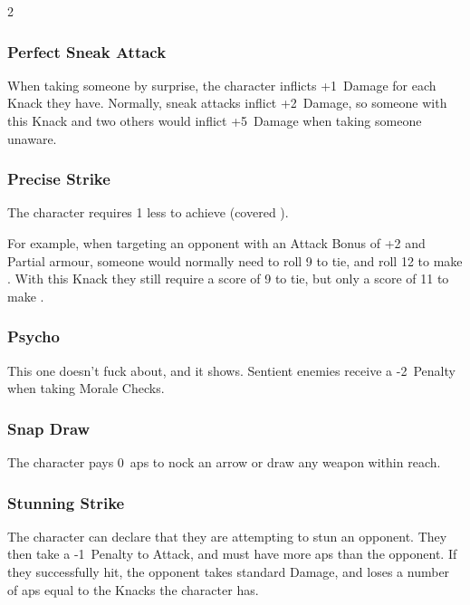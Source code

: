 \begin{multicols}{2}
\subsubsection{Perfect Sneak Attack}

When taking someone by surprise, the character inflicts +1~Damage for each Knack they have.
Normally, sneak attacks inflict +2~Damage, so someone with this Knack and two others would inflict +5~Damage when taking someone unaware.

\subsubsection{Precise Strike}\label{precisestrike}

The character requires 1 less to achieve  (covered ).

\begin{exampletext}
  \noindent%
  For example, when targeting an opponent with an Attack Bonus of +2 and Partial armour, someone would normally need to roll 9 to tie, and roll 12 to make .
  With this Knack they still require a score of 9 to tie, but only a score of 11 to make .
\end{exampletext}

\subsubsection{Psycho}

This one doesn't fuck about, and it shows.
Sentient enemies receive a -2~Penalty when taking Morale Checks.%

\subsubsection{Snap Draw}
\label{snapDraw}

The character pays 0~\glspl{ap} to nock an arrow or draw any \gls{weapon} within reach.

\subsubsection{Stunning Strike}\label{stunningstrike}

The character can declare that they are attempting to stun an opponent.
They then take a -1~Penalty to Attack, and must have more \glspl{ap} than the opponent.
If they successfully hit, the opponent takes standard Damage, and loses a number of \glspl{ap} equal to the Knacks the character has.


\end{multicols}
